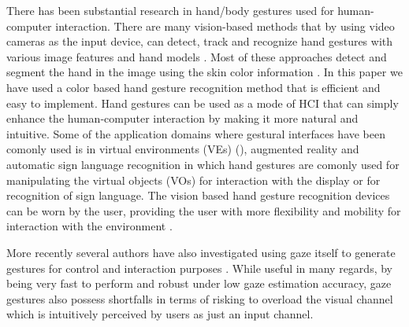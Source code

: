 \documentclass[jou,a4paper,notxfonts]{apa}
\begin{document}
 There has been substantial research in hand/body gestures used for human-computer interaction. There are many vision-based methods that by using video cameras as the input device, can detect, track and recognize hand gestures with various image features and hand models \cite{surveygesturerecognition}. Most of these approaches detect and segment the hand in the image using the skin color information \cite{argyros2004real}. In this paper we have used a color based hand gesture recognition method that is efficient and easy to implement.
 Hand gestures can be used as a mode of HCI that can simply enhance the human-computer interaction by making it more natural and intuitive. Some of the application domains where gestural interfaces have been comonly used is in virtual environments (VEs) (\cite{adam1993virtual, krueger1991artificial}), augmented reality \cite{buchmann2004fingartips} and automatic sign language recognition \cite{Rozado2012b,myicann2010} in which hand gestures are comonly used for manipulating the virtual objects (VOs) for interaction with the display or for recognition of sign language.
The vision based hand gesture recognition devices can be worn by the user, providing the user with more flexibility and mobility for interaction with the environment \cite{starner2000gesture,amento2002sound}.

More recently several authors have also investigated using gaze itself to generate gestures for control and interaction purposes \cite{istance, Rozado2012a, drewessecurity, myiwann2011, emilieetra, interactingWithComputerUsingGazeGestures}. While useful in many regards, by being very fast to perform and robust under low gaze estimation accuracy, gaze gestures also possess shortfalls in terms of risking to overload the visual channel which is intuitively perceived by users as just an input channel.
\end{document}
